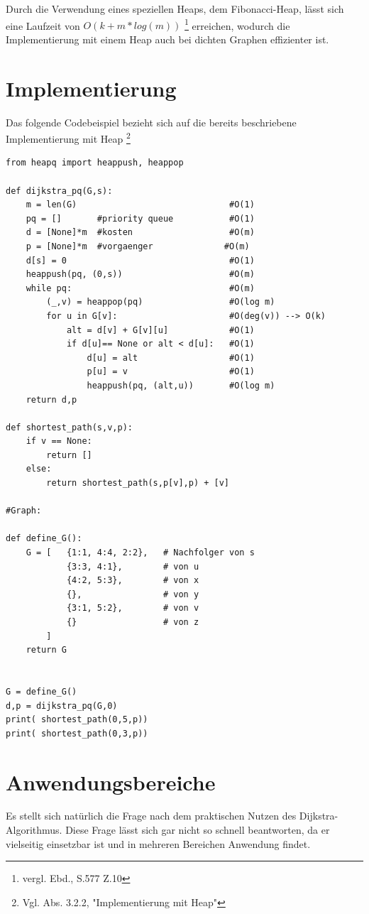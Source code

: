 \parindent0pt Durch die Verwendung eines speziellen Heaps, dem Fibonacci-Heap, lässt sich eine Laufzeit von $O(k + m * log(m))$ \footnote{vergl. Ebd., S.577 Z.10} erreichen, wodurch die Implementierung mit einem Heap auch bei dichten Graphen effizienter ist.


\section{Implementierung}

Das folgende Codebeispiel bezieht sich auf die bereits beschriebene Implementierung mit Heap \footnote{Vgl. Abs. 3.2.2, "Implementierung mit Heap"}

\lstset{language=Python}
\begin{lstlisting}
from heapq import heappush, heappop

def dijkstra_pq(G,s):
    m = len(G)                              #O(1)
    pq = []       #priority queue           #O(1)
    d = [None]*m  #kosten                   #O(m)
    p = [None]*m  #vorgaenger		       #O(m)
    d[s] = 0                                #O(1)
    heappush(pq, (0,s))                     #O(m)
    while pq:                               #O(m)
        (_,v) = heappop(pq)                 #O(log m)
        for u in G[v]:                      #O(deg(v)) --> O(k)  
            alt = d[v] + G[v][u]            #O(1)
            if d[u]== None or alt < d[u]:   #O(1)
                d[u] = alt		            #O(1)	
               	p[u] = v                    #O(1)
                heappush(pq, (alt,u))       #O(log m)        
    return d,p

def shortest_path(s,v,p):
	if v == None:
		return []
	else:
		return shortest_path(s,p[v],p) + [v]
 
#Graph: 
    
def define_G():
    G = [   {1:1, 4:4, 2:2},   # Nachfolger von s
            {3:3, 4:1},        # von u
            {4:2, 5:3},        # von x
            {},                # von y
            {3:1, 5:2},        # von v
            {}                 # von z
        ]
    return G


G = define_G()
d,p = dijkstra_pq(G,0)
print( shortest_path(0,5,p))
print( shortest_path(0,3,p))
\end{lstlisting}

\section{Anwendungsbereiche}
Es stellt sich natürlich die Frage nach dem praktischen Nutzen des Dijkstra-Algorithmus. Diese Frage lässt sich gar nicht so schnell beantworten, da er vielseitig einsetzbar ist und in mehreren Bereichen Anwendung findet.

